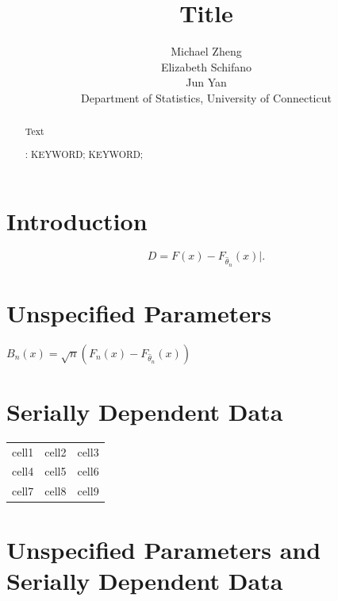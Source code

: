 \documentclass[12pt, letterpaper, titlepage]{article}
\title{Title}
\author{Michael Zheng\\
  Elizabeth Schifano\\
  Jun Yan\\[1ex]
  Department of Statistics, University of Connecticut\\
}
\date{}
\begin{document}
\maketitle

\doublespace

\begin{abstract}
\lipsum[1]
Text

\bigskip
\noindent{}:
KEYWORD;
KEYWORD;
\end{abstract}

\section{Introduction}
\label{sec:intro}
\lipsum[1]

\begin{equation}
  \label{eq:eq1}
  D = F(x) - F_{\hat\theta_n}(x) |.
\end{equation}

\section{Unspecified Parameters}
\label{sec:fitted}

\lipsum[1]

$B_{n}(x) = \sqrt{n}(F_{n}(x) - F_{\hat\theta_n}(x))$

\section{Serially Dependent Data}
\label{sec:dependence}

\lipsum[1]

\begin{center}
\begin{tabular}{ |c|c|c| } 
 \hline
 cell1 & cell2 & cell3 \\ 
 cell4 & cell5 & cell6 \\ 
 cell7 & cell8 & cell9 \\ 
 \hline
\end{tabular}
\label{table:table1}
\end{center}

\section{Unspecified Parameters and Serially Dependent Data}
\label{sec:fittedwithdependence}

\lipsum[1]
\end{document}
